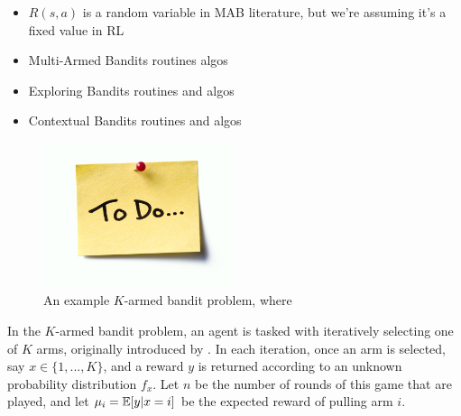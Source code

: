 
    \begin{itemize}
        \item $R(s,a)$ is a random variable in MAB literature, but we're assuming it's a fixed value in RL
        \item Multi-Armed Bandits routines algos
        \item Exploring Bandits routines and algos
        \item Contextual Bandits routines and algos
    \end{itemize}

    \begin{figure}
        \centering\includegraphics[width=0.5\textwidth]{figures/todo.jpg} 
        \caption[An example $K$-armed bandit problem.]{An example $K$-armed bandit problem, where }
        \label{fig:mab_example}
    \end{figure}




    In the $K$-armed bandit problem, an agent is tasked with iteratively selecting one of $K$ arms, originally introduced by  . In each iteration, once an arm is selected, say $x\in\{1,...,K\}$, and a reward $y$ is returned according to an unknown probability distribution $f_x$. Let $n$ be the number of rounds of this game that are played, and let $\mu_i=\mathbb{E}[y|x=i]$ be the expected reward of pulling arm $i$. 
    
